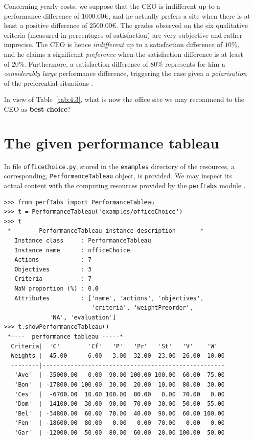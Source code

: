 Concerning yearly costs, we suppose that the CEO is indifferent up to a performance difference of $1000.00$€, and he actually prefers a site when there is at least a positive difference of $2500.00$€. The grades observed on the six qualitative criteria (measured in percentages of satisfaction) are very subjective and rather imprecise. The CEO is hence \emph{indifferent} up to a satisfaction difference of $10\%$, and he claims a significant \emph{preference} when the satisfaction difference is at least of $20\%$.  Furthermore, a satisfaction difference of $80\%$ represents for him a \emph{considerably large} performance difference, triggering the case given a \emph{polarisation} of the preferential situations \citep{BIS-2013}. 

In view of Table~\ref{tab:4.3}, what is now the office site we may recommend to the CEO as \textbf{best choice}?

\section{The given performance tableau}
\label{sec:4.2}


In file \texttt{officeChoice.py}, stored in the \texttt{examples} directory of the \Digraph resources, a corresponding, \texttt{PerformanceTableau} object, is provided. We may inspect its actual content with the computing resources provided by the \texttt{perfTabs} module .
\begin{lstlisting}[caption={Inspecting the \texttt{officeChoice} performance tableau.},label=list:4.1]
>>> from perfTabs import PerformanceTableau
>>> t = PerformanceTableau('examples/officeChoice')
>>> t
 *------- PerformanceTableau instance description ------*
   Instance class     : PerformanceTableau
   Instance name      : officeChoice
   Actions            : 7
   Objectives         : 3
   Criteria           : 7
   NaN proportion (%) : 0.0
   Attributes         : ['name', 'actions', 'objectives',
                         'criteria', 'weightPreorder',
			 'NA', 'evaluation']
>>> t.showPerformanceTableau()
 *----  performance tableau -----*
  Criteria|  'C'        'Cf'   'P'   'Pr'   'St'   'V'    'W'   
  Weights |  45.00      6.00   3.00  32.00  23.00  26.00  10.00    
  --------|----------------------------------------------------
   'Ave'  | -35000.00   0.00  90.00 100.00 100.00  60.00  75.00  
   'Bon'  | -17800.00 100.00  30.00  20.00  10.00  80.00  30.00  
   'Ces'  |  -6700.00  10.00 100.00  80.00   0.00  70.00   0.00  
   'Dom'  | -14100.00  30.00  90.00  70.00  30.00  50.00  55.00  
   'Bel'  | -34800.00  60.00  70.00  40.00  90.00  60.00 100.00  
   'Fen'  | -18600.00  80.00   0.00   0.00  70.00   0.00   0.00  
   'Gar'  | -12000.00  50.00  80.00  60.00  20.00 100.00  50.00  
\end{lstlisting}

